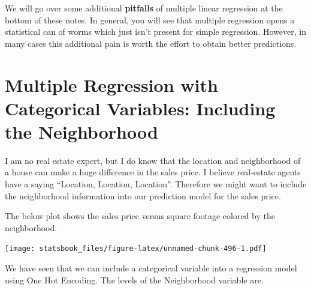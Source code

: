 \documentclass[
]{book}
\newenvironment{Shaded}{\begin{snugshade}}{\end{snugshade}}
\newcommand{\AttributeTok}[1]{\textcolor[rgb]{0.77,0.63,0.00}{#1}}
\newcommand{\FloatTok}[1]{\textcolor[rgb]{0.00,0.00,0.81}{#1}}
\newcommand{\FunctionTok}[1]{\textcolor[rgb]{0.00,0.00,0.00}{#1}}
\newcommand{\NormalTok}[1]{#1}
\newcommand{\SpecialCharTok}[1]{\textcolor[rgb]{0.00,0.00,0.00}{#1}}
\newcommand{\StringTok}[1]{\textcolor[rgb]{0.31,0.60,0.02}{#1}}
\theoremstyle{definition}
\theoremstyle{definition}
\theoremstyle{definition}
\theoremstyle{definition}
\theoremstyle{remark}
\begin{document}
We will go over some additional \textbf{pitfalls} of multiple linear regression at the bottom of these notes. In general, you will see that multiple regression opens a statistical can of worms which just isn't present for simple regression. However, in many cases this additional pain is worth the effort to obtain better predictions.

\hypertarget{multiple-regression-with-categorical-variables-including-the-neighborhood}{%
\section{Multiple Regression with Categorical Variables: Including the Neighborhood}\label{multiple-regression-with-categorical-variables-including-the-neighborhood}}

I am no real estate expert, but I do know that the location and neighborhood of a house can make a huge difference in the sales price. I believe real-estate agents have a saying ``Location, Location, Location''. Therefore we might want to include the neighborhood information into our prediction model for the sales price.

The below plot shows the sales price versus square footage colored by the neighborhood.

\begin{Shaded}
\end{Shaded}

\texttt{[image: statsbook\_files/figure-latex/unnamed-chunk-496-1.pdf]}

We have seen that we can include a categorical variable into a regression model using One Hot Encoding. The levels of the Neighborhood variable are.

\begin{Shaded}
\end{Shaded}
\end{document}
